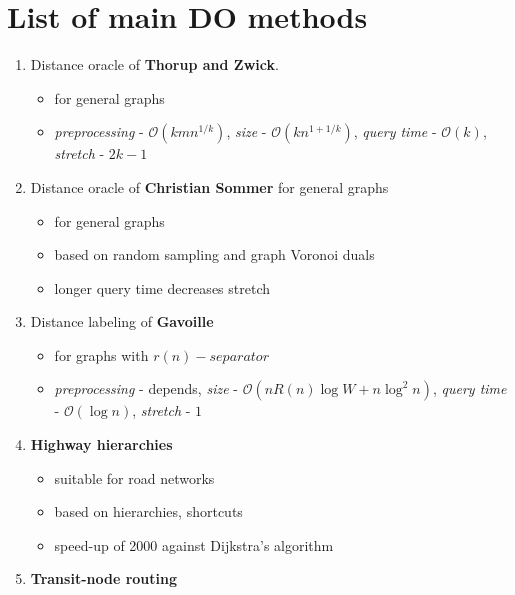 \documentclass[a4paper]{article}
\begin{document}
    \section{List of main DO methods}
        \begin{enumerate}
            \item Distance oracle of \textbf{Thorup and Zwick}.
            \begin{itemize}
                \item for general graphs
                \item \emph{preprocessing} - $\mathcal{O}(kmn^{1/k})$, \emph{size} - $\mathcal{O}(kn^{1 + 1/k})$, \emph{query time} - $\mathcal{O}(k)$, \emph{stretch} - $2k - 1$
            \end{itemize}
            \item Distance oracle of \textbf{Christian Sommer} for general graphs
            \begin{itemize}
                \item for general graphs
                \item based on random sampling and graph Voronoi duals
                \item longer query time decreases stretch
            \end{itemize}
            \item Distance labeling of \textbf{Gavoille}
            \begin{itemize}
                \item for graphs with $r(n)-separator$
                \item \emph{preprocessing} - depends, \emph{size} - $\mathcal{O}(n R(n) \log W + n \log^{2} n)$, \emph{query time} - $\mathcal{O}(\log n)$, \emph{stretch} - $1$
            \end{itemize}
            \item \textbf{Highway hierarchies}
            \begin{itemize}
                \item suitable for road networks
                \item based on hierarchies, shortcuts
                \item speed-up of 2000 against Dijkstra's algorithm
            \end{itemize}
            \item \textbf{Transit-node routing}

\end{enumerate}
\end{document}
